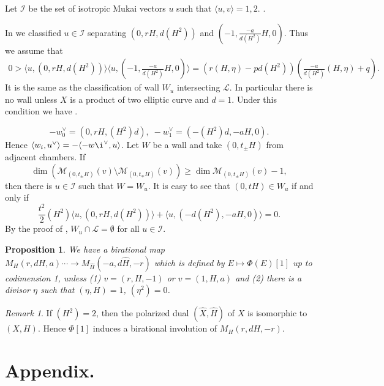 \documentclass[10pt]{amsart}
\def\cal{\mathcal}
\newenvironment{NB}{
\color{red}{\bf NB}. \footnotesize 
}{}
\numberwithin{equation}{section}
\theoremstyle{plain}
\newtheorem{prop}[thm]{Proposition}
\theoremstyle{definition}
\theoremstyle{remark}
\newtheorem{rem}[thm]{Remark}
\begin{document}
Let ${\cal I}$ be the set of isotropic Mukai vectors $u$
such that $\langle u,v \rangle=1,2$.
%
\begin{NB}
In \cite{BMOY}
we classified $u \in {\cal I}$ separating
$(0,rH,d(H^2))$ and $(-1,\tfrac{-a}{d(H^2)}H,0)$.
Thus we assume that
\begin{equation}\label{eq:condition1}
\begin{split}
0 > \langle u,(0,rH,d(H^2)) \rangle
\langle u,(-1,\tfrac{-a}{d(H^2)}H,0) \rangle 
=(r(H,\eta)-pd(H^2))(\tfrac{-a}{d(H^2)}(H,\eta)+q).
\end{split}
\end{equation}
It is the same as the classification of wall $W_u$ intersecting ${\cal L}$.
In particular there is no wall unless $X$ is a product of two elliptic curve and
$d=1$.
Under this condition we have 
\end{NB}
%
\begin{NB}
$$
-w_0^{\vee}=(0,rH,(H^2)d),\;
-w_1^{\vee}=(-(H^2)d,-aH,0).
$$
Hence $\langle w_i,u^{\vee} \rangle=-\langle -w\i^{\vee},u \rangle$. 
\end{NB}
%
Let $W$ be a wall and take $(0,t_\pm H)$ from adjacent chambers.
If 
$$
\dim ({\cal M}_{(0,t_\pm H)}(v) \setminus  {\cal M}_{(0,t_\mp H)}(v)) \geq
\dim {\cal M}_{(0,t_\pm H)}(v)-1,
$$
then there is $u \in {\cal I}$ such that $W=W_u$.
It is easy to see that
$(0,tH) \in W_u$ if and only if  
$$
\frac{t^2}{2}(H^2) \langle u,(0,rH,d(H^2)) \rangle+\langle u,(-d(H^2),-aH,0) \rangle=0.
$$
By the proof of
\cite[Lem. 6.3]{BMOY}, $W_u \cap {\cal L} =\emptyset$ for all $u \in {\cal I}$.



\begin{prop}
We have a birational map
$M_H(r,dH,a) \cdots \to M_{\widehat{H}}(-a,d\widehat{H},-r)$ which is defined
by $E \mapsto \Phi(E)[1]$
up to codimension 1,
unless (1) $v=(r,H,-1)$ or $v=(1,H,a)$ and (2)
there is a divisor $\eta$ such that
$(\eta,H)=1$, $(\eta^2)=0$.
\end{prop}

\begin{rem}
If $(H^2)=2$, then the polarized dual $(\widehat{X},\widehat{H})$ of $X$ is isomorphic to $(X,H)$.
Hence $\Phi[1]$ induces a birational involution of
$M_H(r,dH,-r)$.
\end{rem}




\section{Appendix.}\label{sect:appexdix}
\end{document}
